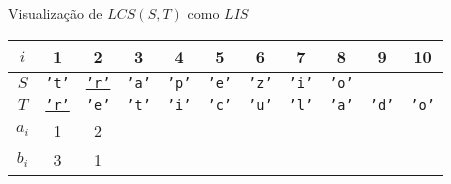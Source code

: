\begin{frame}[fragile]{Visualização de $LCS(S, T)$ como $LIS$}

    \begin{table}
        \centering

        \begin{tabular}{c|cccccccccc} 
        \hline 
        $i$ & 1 & 2 & 3 & 4 & 5 & 6 & 7 & 8 & 9 & 10\\
        \hline
        $S$
        & {\textcolor{blue!80!black}{\texttt{'t'}}}
        & \underline{\textcolor{blue!80!black}{\texttt{'r'}}}
        & \textcolor{blue!80!black}{\texttt{'a'}}
        & \textcolor{blue!80!black}{\texttt{'p'}}
        & \textcolor{blue!80!black}{\texttt{'e'}}
        & \textcolor{blue!80!black}{\texttt{'z'}}
        & \textcolor{blue!80!black}{\texttt{'i'}}
        & \textcolor{blue!80!black}{\texttt{'o'}} \\
        $T$
        & \underline{\textcolor{green!50!black}{\texttt{'r'}}}
        & \textcolor{green!50!black}{\texttt{'e'}}
        & \textcolor{green!50!black}{\texttt{'t'}}
        & \textcolor{green!50!black}{\texttt{'i'}}
        & \textcolor{green!50!black}{\texttt{'c'}}
        & \textcolor{green!50!black}{\texttt{'u'}}
        & \textcolor{green!50!black}{\texttt{'l'}}
        & \textcolor{green!50!black}{\texttt{'a'}}
        & \textcolor{green!50!black}{\texttt{'d'}}
        & \textcolor{green!50!black}{\texttt{'o'}} \\
        $a_i$ & 1 & 2\\
        $b_i$ & 3 & 1\\
        \hline
        \end{tabular}

    \end{table}

\end{frame}

